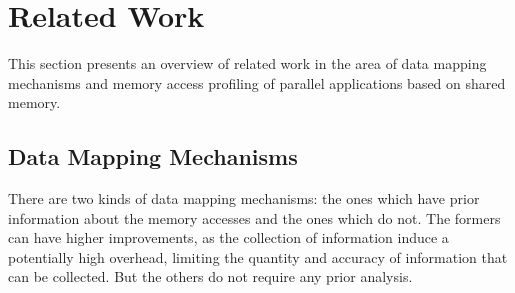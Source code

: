 
\section{Related Work}
\label{sec:soa}

This section presents an overview of related work in the area of data mapping mechanisms and memory access profiling of parallel applications based on shared memory.

\subsection{Data Mapping Mechanisms}
\label{sec:soa-mapping}

There are two kinds of data mapping mechanisms: the ones which have prior
information about the memory accesses and the ones which do not. The formers can
have higher improvements, as the collection of information induce a
potentially high overhead, limiting the quantity and accuracy of information that can be collected.
But the others do not require any prior analysis.
%
%    

